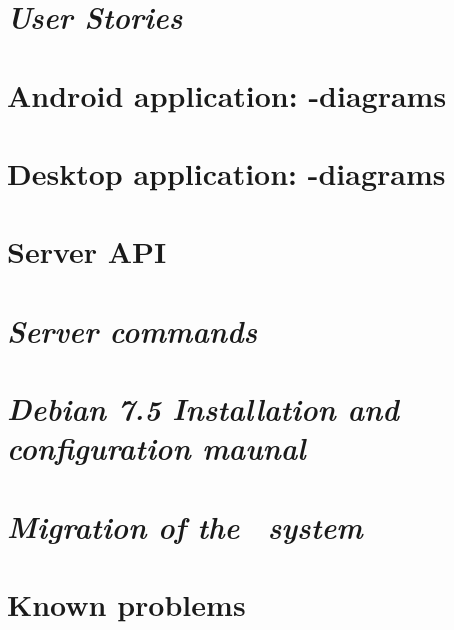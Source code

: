 \begin{appendix}

\chapter{\textit{User Stories}}


\chapter{Android application: -diagrams}


\chapter{Desktop application: -diagrams}
\label{chap:des_appendix}


\chapter{Server API}


\chapter{\textit{Server commands}}


%

\chapter{\textit{Debian 7.5 Installation and configuration maunal}}


\chapter{\textit{Migration of the \appName\ system}}


\chapter{Known problems}
\label{chap:knownProblems}


\end{appendix}
